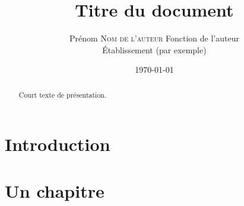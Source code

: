 \documentclass[frenchb, 12pt, twoside, a4paper]{article}
\title{Titre du document}
\author{
  Prénom \textsc{Nom de l'auteur} 
  Fonction de l'auteur \\
  Établissement (par exemple) \\
  }
\date{\today}                           %
\begin{document}
\maketitle                              %

{
\renewcommand{\contentsname}{Sommaire}  %
\tableofcontents                        %
}


\begin{abstract}
Court texte de présentation.
\end{abstract}



\section*{Introduction}

\section{Un chapitre}




\begin{comment} Les 9 lignes suivantes sont en "commentaire", ignorées par le compilateur.
\subsection{Un sous-chapitre}
…
\paragraph{Sous-partie de sous-chapitre}
…


\subsection{Autre sous-chapitre}
…
\end{comment}

\end{document}
